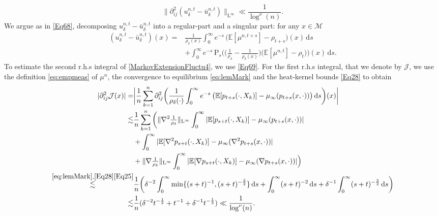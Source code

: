 \documentclass[11pt,a4paper,oneside]{amsart}
\numberwithin{equation}{section}
\newcommand{\dd}{\mathrm{d}}
\newcommand{\LL}{\mathrm{L}}
\begin{document}
%
\begin{equation}\label{ExtensionMarkovFluctu2}
%
\|\partial^2_{ij}(u^{n,t}_\delta-\bar{u}^{n,t}_\delta)\|_{\LL^{\infty}}\ll \frac{1}{\log^{\nu}(n)}.
%
\end{equation}
%
We argue as in \eqref{Eq68}, decomposing $u^{n,t}_\delta-\bar{u}^{n,t}_\delta$ into a regular-part and a singular part: for any $x\in\mathcal{M}$
%
\begin{equation}\label{MarkovExtensionFluctu4}
%
\begin{aligned}
%
(u^{n,t}_\delta-\bar{u}^{n,t}_\delta)(x)=&\frac1{\rho_\delta(x)}\int_0^\infty e^{-s}\,\big(\mathbb{E}[\mu^{n,t+s}] - \rho_{t+s}\big)(x)\,\dd s\\
&+ \int_0^\infty e^{-s}\,\text{P}_s \Big(\big(\tfrac1{\rho_\delta}-\tfrac1{\rho_\delta(x)}\big)\big(\mathbb{E}[\mu^{n,t}] - \rho_t\big)\Big)(x)\,\dd s.
%
\end{aligned}
%
\end{equation}
%
To estimate the second r.h.s integral of \eqref{MarkovExtensionFluctu4}, we use \eqref{Eq69}. For the first r.h.s integral, that we denote by $\mathcal{J}$, we use the definition \eqref{eq:empmeas} of $\mu^n$, the convergence to equilibrium \eqref{eq:lemMark} and the heat-kernel bounds \eqref{Eq28} to obtain 
%
\begin{align*}
%
\vert\partial^2_{ij}\mathcal{J}(x)\vert=&\bigg\vert\frac{1}{n}\sum_{k=1}^n\partial^2_{ij}\bigg(\frac1{\rho_\delta(\cdot)}\int_0^\infty e^{-s}\,\big(\mathbb{E}[p_{t+s}(\cdot,X_k)] - \mu_\infty(p_{t+s}(x,\cdot))\big)\,\dd s\bigg)(x)\bigg\vert\\
\lesssim& \frac{1}{n}\sum_{k=1}^n\bigg(\|\nabla^2\tfrac{1}{\rho_\delta}\|_{\LL^\infty}\int_{0}^\infty \vert\mathbb{E}[p_{s+t}(\cdot,X_k)]-\mu_\infty(p_{t+s}(x,\cdot))\vert\\
&+\int_{0}^\infty \vert\mathbb{E}[\nabla^2 p_{s+t}(\cdot,X_k)]-\mu_\infty(\nabla^2 p_{t+s}(x,\cdot))\vert\\
&+\|\nabla\tfrac{1}{\rho_\delta}\|_{\LL^\infty}\int_{0}^\infty \vert\mathbb{E}[\nabla p_{s+t}(\cdot,X_k)]-\mu_\infty(\nabla p_{t+s}(x,\cdot))\vert\Big)\\
\stackrel{\eqref{eq:lemMark},\eqref{Eq28}\eqref{Eq25}}{\lesssim}&\frac{1}{n}\bigg(\delta^{-2}\int_{0}^\infty \min\{(s+t)^{-1},(s+t)^{-\frac{3}{2}}\}\,\dd s+\int_{0}^\infty (s+t)^{-2}\,\dd s+\delta^{-1}\int_{0}^{\infty} (s+t)^{-\frac{3}{2}}\, \dd s\bigg)\\
\lesssim & \frac{1}{n}(\delta^{-2}t^{-\frac{1}{2}}+t^{-1}+\delta^{-1}t^{-\frac{1}{2}})\ll \frac{1}{\log^{\nu}(n)}.
%
\end{align*}
\end{document}
